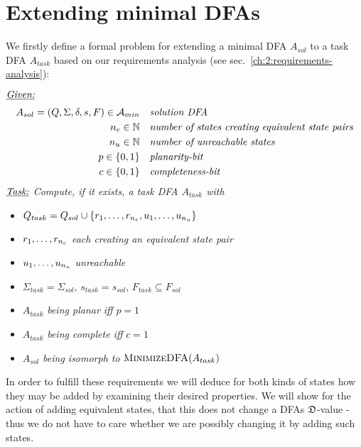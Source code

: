 
\chapter{Extending minimal DFAs} \label{ch:4}

We firstly define a formal problem for extending a minimal DFA $A_{sol}$ to a task DFA $A_{task}$ based on our requirements analysis (see sec.~\ref{ch:2:requirements-analysis}):
\begin{definition}[ExtendMinimalDFA] $ $ \\
	$ $ \vspace{-0.cm} \\
	\noindent $\underline{\emph{Given:}}$
	\vspace{-0.2cm}
	\begin{align*}
	A_{sol} = (Q, \Sigma, \delta, s, F) \in {\mathcal{A}_{min}}\ \ \ & \emph{solution DFA} \\
	{n_e} \in \mathbb{N}\ \ \ & \emph{number of states creating equivalent state pairs} \\
	{n_u} \in \mathbb{N}\ \ \ & \emph{number of unreachable states} \\
	p \in \{0,1\}\ \ \ & \emph{planarity-bit} \\
	c \in \{0,1\}\ \ \ & \emph{completeness-bit}
	\end{align*}
	\noindent $\underline{\emph{Task:}}$ \emph{Compute, if it exists, a task DFA $A_{task}$ with}
	\begin{itemize}
		\item $Q_{task} = Q_{sol} \cup \{ r_1, \ldots, r_{n_e}, u_1, \ldots, u_{n_u} \}$
		\item $r_1, \ldots, r_{n_e}$ \emph{each creating an equivalent state pair}
		\item $u_1, \ldots, u_{n_u}$ \emph{unreachable}
		\item $\Sigma_{task} = \Sigma_{sol}$, $s_{task} = s_{sol}$, $F_{task} \subseteq F_{sol}$
		\item $A_{task}$ \emph{being planar iff} $p = 1$
		\item $A_{task}$ \emph{being complete iff} $c = 1$
		\item $A_{sol}$ \emph{being isomorph to} $\textsc{MinimizeDFA}(A_{task})$
	\end{itemize}
\end{definition}
\noindent In order to fulfill these requirements we will deduce for both kinds of states how they may be added by examining their desired properties. We will show for the action of adding equivalent states, that this does not change a DFAs $\mathfrak{D}$-value - thus we do not have to care whether we are possibly changing it by adding such states.

